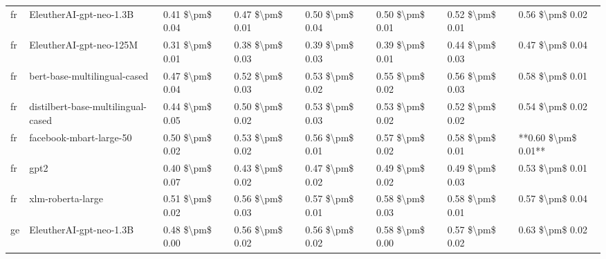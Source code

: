 \begin{tabular}{llllllll}
      fr &            EleutherAI-gpt-neo-1.3B & 0.41 \$\textbackslash pm\$ 0.04 &           0.47 \$\textbackslash pm\$ 0.01 &       0.50 \$\textbackslash pm\$ 0.04 &        0.50 \$\textbackslash pm\$ 0.01 &                         0.52 \$\textbackslash pm\$ 0.01 &     0.56 \$\textbackslash pm\$ 0.02 \\
      fr &            EleutherAI-gpt-neo-125M & 0.31 \$\textbackslash pm\$ 0.01 &           0.38 \$\textbackslash pm\$ 0.03 &       0.39 \$\textbackslash pm\$ 0.03 &        0.39 \$\textbackslash pm\$ 0.01 &                         0.44 \$\textbackslash pm\$ 0.03 &     0.47 \$\textbackslash pm\$ 0.04 \\
      fr &       bert-base-multilingual-cased & 0.47 \$\textbackslash pm\$ 0.04 &           0.52 \$\textbackslash pm\$ 0.03 &       0.53 \$\textbackslash pm\$ 0.02 &        0.55 \$\textbackslash pm\$ 0.02 &                         0.56 \$\textbackslash pm\$ 0.03 &     0.58 \$\textbackslash pm\$ 0.01 \\
      fr & distilbert-base-multilingual-cased & 0.44 \$\textbackslash pm\$ 0.05 &           0.50 \$\textbackslash pm\$ 0.02 &       0.53 \$\textbackslash pm\$ 0.03 &        0.53 \$\textbackslash pm\$ 0.02 &                         0.52 \$\textbackslash pm\$ 0.02 &     0.54 \$\textbackslash pm\$ 0.02 \\
      fr &            facebook-mbart-large-50 & 0.50 \$\textbackslash pm\$ 0.02 &           0.53 \$\textbackslash pm\$ 0.02 &       0.56 \$\textbackslash pm\$ 0.01 &        0.57 \$\textbackslash pm\$ 0.02 &                         0.58 \$\textbackslash pm\$ 0.01 & **0.60 \$\textbackslash pm\$ 0.01** \\
      fr &                               gpt2 & 0.40 \$\textbackslash pm\$ 0.07 &           0.43 \$\textbackslash pm\$ 0.02 &       0.47 \$\textbackslash pm\$ 0.02 &        0.49 \$\textbackslash pm\$ 0.02 &                         0.49 \$\textbackslash pm\$ 0.03 &     0.53 \$\textbackslash pm\$ 0.01 \\
      fr &                  xlm-roberta-large & 0.51 \$\textbackslash pm\$ 0.02 &           0.56 \$\textbackslash pm\$ 0.03 &       0.57 \$\textbackslash pm\$ 0.01 &        0.58 \$\textbackslash pm\$ 0.03 &                         0.58 \$\textbackslash pm\$ 0.01 &     0.57 \$\textbackslash pm\$ 0.04 \\
      ge &            EleutherAI-gpt-neo-1.3B & 0.48 \$\textbackslash pm\$ 0.00 &           0.56 \$\textbackslash pm\$ 0.02 &       0.56 \$\textbackslash pm\$ 0.02 &        0.58 \$\textbackslash pm\$ 0.00 &                         0.57 \$\textbackslash pm\$ 0.02 &     0.63 \$\textbackslash pm\$ 0.02 \\

\end{tabular}
